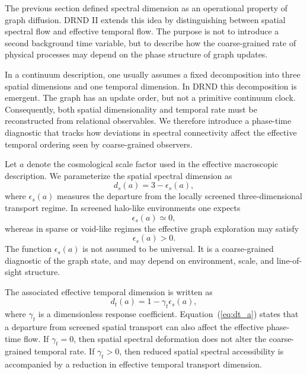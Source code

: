 \documentclass[12pt]{iopart}
\begin{document}
The previous section defined spectral dimension as an operational property of graph diffusion. DRND II extends this idea by distinguishing between spatial spectral flow and effective temporal flow. The purpose is not to introduce a second background time variable, but to describe how the coarse-grained rate of physical processes may depend on the phase structure of graph updates.

In a continuum description, one usually assumes a fixed decomposition into three spatial dimensions and one temporal dimension. In DRND this decomposition is emergent. The graph has an update order, but not a primitive continuum clock. Consequently, both spatial dimensionality and temporal rate must be reconstructed from relational observables. We therefore introduce a phase-time diagnostic that tracks how deviations in spectral connectivity affect the effective temporal ordering seen by coarse-grained observers.

Let \(a\) denote the cosmological scale factor used in the effective macroscopic description. We parameterize the spatial spectral dimension as
\begin{equation}
d_s(a)=3-\epsilon_s(a),
\label{eq:ds_a}
\end{equation}
where \(\epsilon_s(a)\) measures the departure from the locally screened three-dimensional transport regime. In screened halo-like environments one expects
\begin{equation}
\epsilon_s(a)\simeq 0,
\end{equation}
whereas in sparse or void-like regimes the effective graph exploration may satisfy
\begin{equation}
\epsilon_s(a)>0.
\end{equation}
The function \(\epsilon_s(a)\) is not assumed to be universal. It is a coarse-grained diagnostic of the graph state, and may depend on environment, scale, and line-of-sight structure.

The associated effective temporal dimension is written as
\begin{equation}
d_t(a)=1-\gamma_t\epsilon_s(a),
\label{eq:dt_a}
\end{equation}
where \(\gamma_t\) is a dimensionless response coefficient. Equation~(\ref{eq:dt_a}) states that a departure from screened spatial transport can also affect the effective phase-time flow. If \(\gamma_t=0\), then spatial spectral deformation does not alter the coarse-grained temporal rate. If \(\gamma_t>0\), then reduced spatial spectral accessibility is accompanied by a reduction in effective temporal transport dimension.
\end{document}
